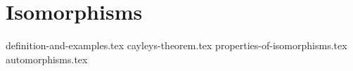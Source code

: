 \chapter{Isomorphisms}
{definition-and-examples.tex}
{cayleys-theorem.tex}
{properties-of-isomorphisms.tex}
{automorphisms.tex}
